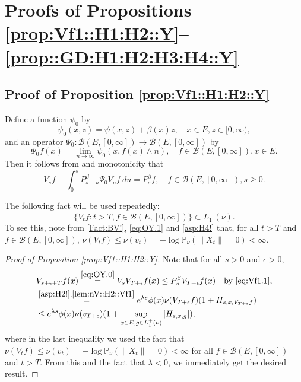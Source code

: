 \documentclass[12pt,a4paper]{amsart}
\numberwithin{equation}{section}
\theoremstyle{plain}
\theoremstyle{definition}
\theoremstyle{remark}
\begin{document}
\section{Proofs of Propositions \ref{prop:Vf1::H1:H2::Y}--\ref{prop::GD:H1:H2:H3:H4::Y}} \label{sec:propsforthm1}
\subsection{Proof of Proposition \ref{prop:Vf1::H1:H2::Y}} \label{sec:Vf1}
	Define a function $\psi_0$ by
\[
	\psi_0(x,z) = \psi(x,z)+ \beta(x) z, \quad x\in E, z\in [0,\infty),
\]	
	and an operator $\Psi_0: \mathcal B(E, [0,\infty]) \to \mathcal B(E,[0,\infty])$ by
\begin{equation}
	\Psi_0 f(x)
	= \lim_{n\to \infty} \psi_0(x,f(x) \wedge n),
	\quad f\in \mathcal B(E,[0,\infty]), x\in E.
\end{equation}
	Then it follows from \cite[Theorem 2.23]{Li2011MeasureValued} and monotonicity that
\begin{equation}\label{eq:Vf1.1}
	V_s f + \int_0^s P_{s-u}^\beta \Psi_0 V_{u} f ~du
	= P_s^\beta f,
	\quad f\in \mathcal B(E,[0,\infty]), s\geq 0.
\end{equation}

	The following fact will be used repeatedly:
\begin{equation} \label{lem:nV::H2::Vf1}
	\{V_tf:t> T, f\in \mathcal B(E, [0,\infty])\}\subset L_1^+(\nu).
\end{equation}
	To see this, note from \eqref{Fact:BV!}, \eqref{eq:OY.1} and \eqref{asp:H4!} that, for  all $t> T$ and $f\in \mathcal B(E,[0,\infty])$, $\nu(V_t f) \leq \nu(v_t)   = - \log \mathbb P_\nu (\|X_t\| = 0)  < \infty. $

\begin{proof}[{Proof of Proposition \ref{prop:Vf1::H1:H2::Y}}]
	Note that for all $s>0$ and $\epsilon>0$,
\begin{align}
	& V_{s+\epsilon +T} f (x)
	\overset{\eqref{eq:OY.0}}= V_s V_{T+\epsilon} f(x)
	\leq P_s^\beta V_{T + \epsilon} f(x)\quad\text{by \eqref{eq:Vf1.1}},
 	\\ \label{eq:Vf1.2} & \overset{\eqref{asp:H2!},\eqref{lem:nV::H2::Vf1}}= e^{\lambda s}\phi(x) \nu( V_{T +\epsilon} f)  (1+ H_{s,x,V_{T + \epsilon} f})
	\\&\leq e^{\lambda s}\phi(x) \nu(v_{T +\epsilon})  (1+ \sup_{x\in E, g\in L_1^+(\nu)}|H_{s,x,g}|),
\end{align}
	where
	in the last inequality we used the fact that $\nu(V_t f) \leq \nu(v_t)   = - \log \mathbb P_\nu (\|X_t\| = 0)  < \infty$
	for all  $f\in \mathcal B(E,[0,\infty])$ and $t > T$.
	From this and the fact that $\lambda < 0$, we immediately get the desired result.
\end{proof}
\end{document}
